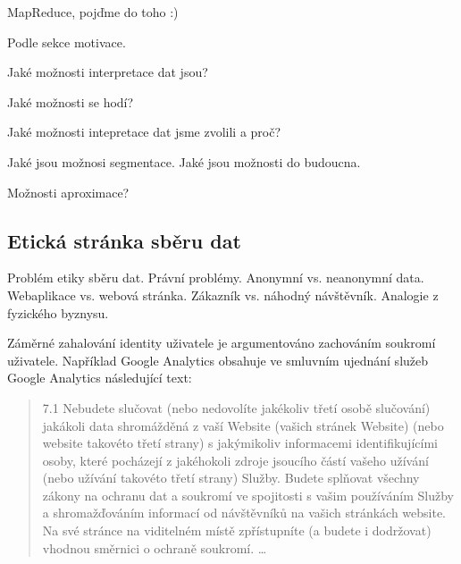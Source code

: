 \documentclass[bc,female,java,dept456]{diploma}						%
\begin{document}
MapReduce, pojďme do toho :)


Podle sekce motivace.

Jaké možnosti interpretace dat jsou?

Jaké možnosti se hodí?

Jaké možnosti intepretace dat jsme zvolili a proč?

Jaké jsou možnosi segmentace. 
Jaké jsou možnosti do budoucna.

Možnosti aproximace?

\subsection{Etická stránka sběru dat}

Problém etiky sběru dat.
Právní problémy.
Anonymní vs. neanonymní data.
Webaplikace vs. webová stránka.
Zákazník vs. náhodný návštěvník.
Analogie z fyzického byznysu.


Záměrné zahalování identity uživatele je argumentováno zachováním soukromí uživatele. Například Google Analytics obsahuje ve smluvním ujednání služeb Google Analytics následující text:

\begin{quote}
7.1 Nebudete slučovat (nebo nedovolíte jakékoliv třetí osobě slučování) jakákoli data shromážděná z vaší Website (vašich stránek Website) (nebo website takovéto třetí strany) s jakýmikoliv informacemi identifikujícími osoby, které pocházejí z jakéhokoli zdroje jsoucího částí vašeho užívání (nebo užívání takovéto třetí strany) Služby. Budete splňovat všechny zákony na ochranu dat a soukromí ve spojitosti s vašim používáním Služby a shromažďováním informací od návštěvníků na vašich stránkách website. Na své stránce na viditelném místě zpřístupníte (a budete i dodržovat) vhodnou směrnici o ochraně soukromí.
\ldots
\end{quote}
\end{document}
